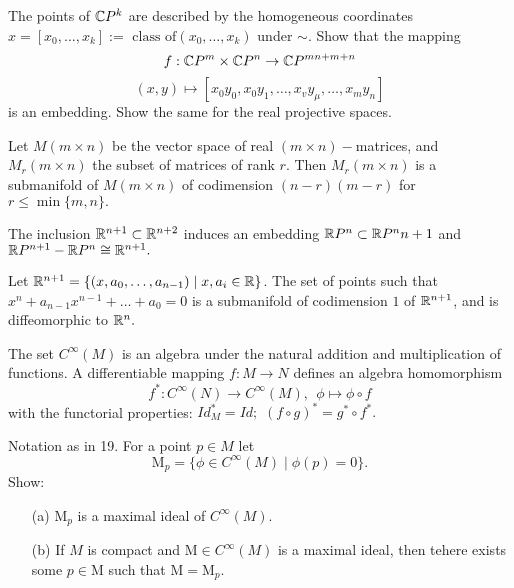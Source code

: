 \begin{problem}{15}
The points of $\mathbb{C} P^k$ are described by the homogeneous coordinates $x = [x_0, \ldots, x_k]:= \text{ class of} (x_0, \ldots, x_k)$ under $\sim$. Show that the mapping 
$$
f: \mathbb{C} P^m \times \mathbb{C} P^n \rightarrow \mathbb{C} P^{mn + m + n}
$$
$$
(x, y) \mapsto [x_0y_0, x_0 y_1, \ldots, x_v y_\mu, \ldots, x_m y_n ]
$$
is an embedding. Show the same for the real projective spaces. 
\end{problem}


\begin{problem}{16}
Let $M(m \times n)$ be the vector space of real $(m\times n)-$matrices, and $M_r(m \times n)$ the subset of matrices of rank $r$. Then $M_r(m \times n)$ is a submanifold of $M(m \times n)$ of codimension $(n-r)(m-r)$ for $r \leq \min \{m,n\}.$
\end{problem}


\begin{problem}{17}
The inclusion $\mathbb{R}^{n+1} \subset \mathbb{R}^{n+2}$ induces an embedding $\mathbb{R} P^n \subset \mathbb{R} P^n{n+1}$ and $\mathbb{R} P^{n+1} - \mathbb{R} P^{n} \cong \mathbb{R}^{n+1}.$
\end{problem}


\begin{problem}{18}
Let $\mathbb{R}^{n+1} = \{(x, a_0, \ldots, a_{n-1}) \mid x, a_i \in \mathbb{R} \}$. The set of points such that $x^n + a_{n-1}x^{n-1}+ \ldots + a_0 = 0$ is a submanifold of codimension $1$ of $\mathbb{R}^{n+1}$, and is diffeomorphic to $\mathbb{R}^n.$
\end{problem}


\begin{problem}{19}
The set $C^\infty(M)$ is an algebra under the natural addition and multiplication of functions. A differentiable mapping $f: M \rightarrow N$ defines an algebra homomorphism
$$
f^\ast: C^\infty(N) \rightarrow C^\infty(M), \ \ \phi \mapsto \phi \circ f
$$
with the functorial properties: $Id^\ast_M = Id;$ $(f \circ g)^\ast = g^\ast \circ f^\ast.$
\end{problem}

\begin{problem}{20}
Notation as in 19. For a point $p\in M$ let 
$$
\mathrm{M}_p = \{\phi \in C^\infty(M) \mid \phi(p) = 0 \}.
$$
Show:
\begin{itemize}
\item[(a)] $\mathrm{M}_p$ is a maximal ideal of $C^\infty(M).$
\item[(b)] If $M$ is compact and $\mathrm{M} \in C^\infty(M)$ is a maximal ideal, then tehere exists some $p \in \mathrm{M}$ such that $\mathrm{M} = \mathrm{M}_p.$
\end{itemize}
\end{problem}